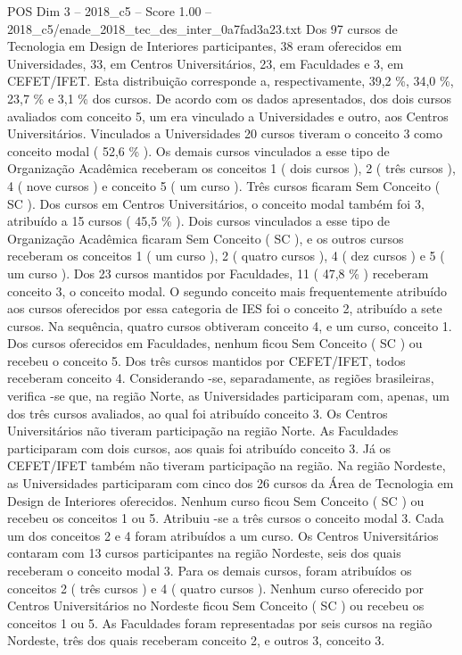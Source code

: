 \begin{textsample}{POS Dim 3 – 2018\_c5 – Score 1.00 – 2018\_c5/enade\_2018\_tec\_des\_inter\_0a7fad3a23.txt}
Dos 97 cursos de Tecnologia em Design de Interiores participantes, 38 eram oferecidos em Universidades, 33, em Centros Universitários, 23, em Faculdades e 3, em CEFET/IFET.
Esta distribuição corresponde a, respectivamente, 39,2 \%, 34,0 \%, 23,7 \% e 3,1 \% dos cursos.
De acordo com os dados apresentados, dos dois cursos avaliados com conceito 5, um era vinculado a Universidades e outro, aos Centros Universitários.
Vinculados a Universidades 20 cursos tiveram o conceito 3 como conceito modal ( 52,6 \% ).
Os demais cursos vinculados a esse tipo de Organização Acadêmica receberam os conceitos 1 ( dois cursos ), 2 ( três cursos ), 4 ( nove cursos ) e conceito 5 ( um curso ).
Três cursos ficaram Sem Conceito ( SC ).
Dos cursos em Centros Universitários, o conceito modal também foi 3, atribuído a 15 cursos ( 45,5 \% ).
Dois cursos vinculados a esse tipo de Organização Acadêmica ficaram Sem Conceito ( SC ), e os outros cursos receberam os conceitos 1 ( um curso ), 2 ( quatro cursos ), 4 ( dez cursos ) e 5 ( um curso ).
Dos 23 cursos mantidos por Faculdades, 11 ( 47,8 \% ) receberam conceito 3, o conceito modal.
O segundo conceito mais frequentemente atribuído aos cursos oferecidos por essa categoria de IES foi o conceito 2, atribuído a sete cursos.
Na sequência, quatro cursos obtiveram conceito 4, e um curso, conceito 1.
Dos cursos oferecidos em Faculdades, nenhum ficou Sem Conceito ( SC ) ou recebeu o conceito 5.
Dos três cursos mantidos por CEFET/IFET, todos receberam conceito 4.
Considerando -se, separadamente, as regiões brasileiras, verifica -se que, na região Norte, as Universidades participaram com, apenas, um dos três cursos avaliados, ao qual foi atribuído conceito 3.
Os Centros Universitários não tiveram participação na região Norte.
As Faculdades participaram com dois cursos, aos quais foi atribuído conceito 3.
Já os CEFET/IFET também não tiveram participação na região.
Na região Nordeste, as Universidades participaram com cinco dos 26 cursos da Área de Tecnologia em Design de Interiores oferecidos.
Nenhum curso ficou Sem Conceito ( SC ) ou recebeu os conceitos 1 ou 5.
Atribuiu -se a três cursos o conceito modal 3.
Cada um dos conceitos 2 e 4 foram atribuídos a um curso.
Os Centros Universitários contaram com 13 cursos participantes na região Nordeste, seis dos quais receberam o conceito modal 3.
Para os demais cursos, foram atribuídos os conceitos 2 ( três cursos ) e 4 ( quatro cursos ).
Nenhum curso oferecido por Centros Universitários no Nordeste ficou Sem Conceito ( SC ) ou recebeu os conceitos 1 ou 5.
As Faculdades foram representadas por seis cursos na região Nordeste, três dos quais receberam conceito 2, e outros 3, conceito 3.

\end{textsample}
